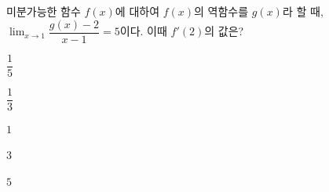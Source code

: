 미분가능한 함수 $f(x)$에 대하여 $f(x)$의 역함수를 $g(x)$라 할 때, $\displaystyle\lim_{x\to 1}\dfrac{g(x)-2}{x-1}=5$이다. 이때 $f'(2)$의 값은?
\begin{choices32}{\rule[-3ex]{0pt}{8ex}$\dfrac{1}{5}$}{\rule[-3ex]{0pt}{8ex}$\dfrac{1}{3}$}{\rule[-3ex]{0pt}{8ex}$1$}{\rule[-3ex]{0pt}{8ex}$3$}{\rule[-3ex]{0pt}{8ex}$5$}\end{choices32}
